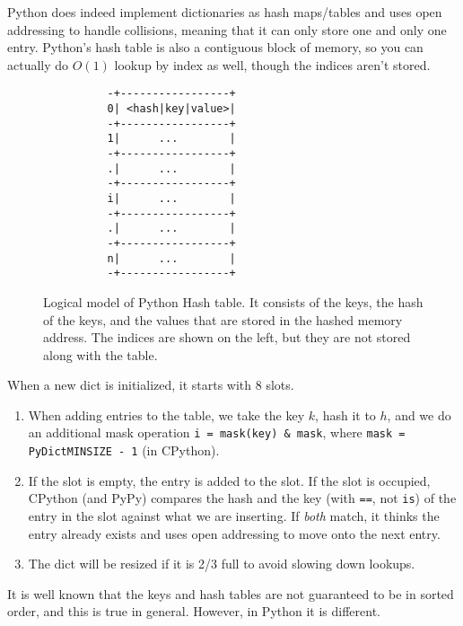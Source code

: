 \documentclass{article}
\begin{document}
    \begin{definition}
      Python does indeed implement dictionaries as hash maps/tables and uses open addressing to handle collisions, meaning that it can only store one and only one entry. Python's hash table is also a contiguous block of memory, so you can actually do $O(1)$ lookup by index as well, though the indices aren't stored. 

      \begin{figure}[H]
        \centering 
        \begin{lstlisting}
          -+-----------------+
          0| <hash|key|value>|
          -+-----------------+
          1|      ...        |
          -+-----------------+
          .|      ...        |
          -+-----------------+
          i|      ...        |
          -+-----------------+
          .|      ...        |
          -+-----------------+
          n|      ...        |
          -+-----------------+ 
        \end{lstlisting}
        \caption{Logical model of Python Hash table. It consists of the keys, the hash of the keys, and the values that are stored in the hashed memory address. The indices are shown on the left, but they are not stored along with the table. }
        \label{fig:hash_table}
      \end{figure}

      When a new dict is initialized, it starts with 8 slots. 
      \begin{enumerate}
        \item When adding entries to the table, we take the key $k$, hash it to $h$, and we do an additional mask operation \texttt{i = mask(key) \& mask}, where \texttt{mask = PyDictMINSIZE - 1} (in CPython). 
        \item If the slot is empty, the entry is added to the slot. If the slot is occupied, CPython (and PyPy) compares the hash and the key (with \texttt{==}, not \texttt{is}) of the entry in the slot against what we are inserting. If \textit{both} match, it thinks the entry already exists and uses open addressing to move onto the next entry. 
        \item The dict will be resized if it is 2/3 full to avoid slowing down lookups. 
      \end{enumerate}
    \end{definition}

    It is well known that the keys and hash tables are not guaranteed to be in sorted order, and this is true in general. However, in Python it is different. 
\end{document}
